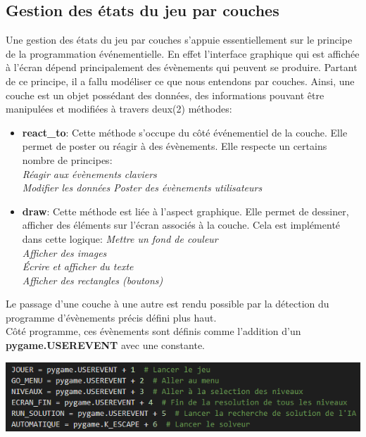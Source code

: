 \documentclass[a4paper,12pt]{article} %
\begin{document}
\subsection{Gestion des états du jeu par couches}

Une gestion des états du jeu par couches s'appuie essentiellement sur le principe de la programmation événementielle. En effet l'interface graphique
qui est affichée à l'écran dépend principalement des évènements qui peuvent se produire. Partant de ce principe, il a fallu modéliser ce que nous entendons 
par couches. Ainsi, une couche est un objet possédant des données, des informations pouvant être manipulées et modifiées à travers deux(2) méthodes:
\begin{itemize}
	\item \textbf{react\_to}: Cette méthode s'occupe du côté événementiel de la couche. Elle permet de poster ou réagir à des évènements. Elle respecte un certains nombre de principes:
	\\
	\emph{
		\tabto{2em} Réagir aux évènements claviers\\
		\tabto{2em} Modifier les données
		\tabto{2em} Poster des évènements utilisateurs
	}
	\item \textbf{draw}: Cette méthode est liée à l'aspect graphique. Elle permet de dessiner, afficher des éléments sur l'écran associés à la couche. Cela est implémenté dans cette logique:
	\emph{
		\tabto{2em} Mettre un fond de couleur\\
		\tabto{2em} Afficher des images\\
		\tabto{2em} Écrire et afficher du texte\\
		\tabto{2em} Afficher des rectangles (boutons)
	}
\end{itemize}
Le passage d'une couche à une autre est rendu possible par la détection du programme d'évènements précis défini plus haut. \\
Côté programme, ces évènements sont définis comme l'addition d'un \textbf{pygame.USEREVENT} avec une constante.
\begin{center}
	\includegraphics[scale=1]{images/Capture_093958.png}
\end{center}
\end{document}
